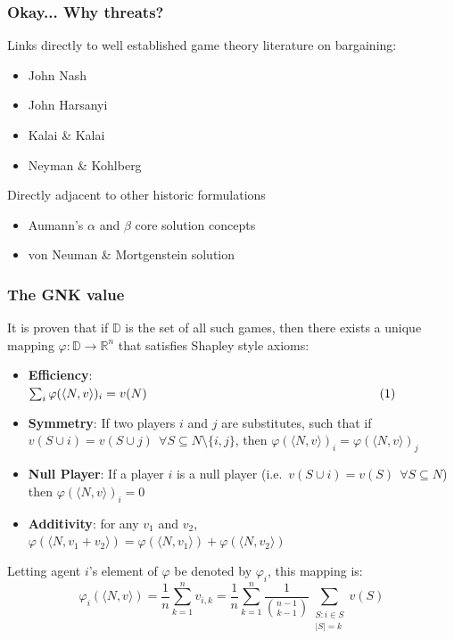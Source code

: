 \begin{frame}
\frametitle{Okay... Why threats?}

Links directly to well established game theory literature on bargaining:
\begin{itemize}
\item	John Nash \cite{nash1,nash2}
\item	John Harsanyi \cite{values3}
\item	Kalai \& Kalai \cite{kalai1,Kalai2010,shap_lectures}
\item	Neyman \& Kohlberg \cite{value2,KOHLBERG2018139}
\end{itemize}
Directly adjacent to other historic formulations
\begin{itemize}
\item	Aumann's $\alpha$ and $\beta$ core solution concepts \cite{aumann1961core}
\item	von Neuman \& Mortgenstein solution \cite{1944}
\end{itemize}

\end{frame}




\begin{frame}
\frametitle{The GNK value}
It is proven that if $\mathbb{D}$ is the set of all such games, then there exists a unique mapping $\varphi:\mathbb{D}\rightarrow\mathbb{R}^n$ that satisfies Shapley style axioms:

\begin{itemize}
\item	\textbf{Efficiency}: $\sum_i\varphi(\langle N,v\rangle)_i = v(N)\qquad\qquad\qquad\qquad\qquad\qquad\qquad\qquad\qquad~~\refstepcounter{equation}(\theequation)\label{myeq}$
\item	\textbf{Symmetry}: If two players $i$ and $j$ are substitutes, such that if $v(S\cup i)=v(S\cup j)~~\forall S\subseteq N\setminus\{i,j\}$, then $\varphi(\langle N,v\rangle)_i = \varphi(\langle N,v\rangle)_j$
\item	\textbf{Null Player}: If a player $i$ is a null player (i.e.\ $v(S\cup i)=v(S)~~\forall S\subseteq N$) then $\varphi(\langle N,v\rangle)_i=0$
\item	\textbf{Additivity}: for any $v_1$ and $v_2$, $\varphi(\langle N,v_1+v_2\rangle)=\varphi(\langle N,v_1 \rangle) + \varphi(\langle N,v_2\rangle)$
\end{itemize}

Letting agent $i$'s element of $\varphi$ be denoted by $\varphi_i$, this mapping is:
\begin{equation}\label{da_value_eq} 
\varphi_i(\langle N,v\rangle)
= \frac{1}{n}\sum_{k=1}^n v_{i,k} 
= \frac{1}{n}\sum_{k=1}^n \frac{1}{\binom{n-1}{k-1}} \sum_{\substack{S:i\in S \\ |S|=k}}v(S) 
\end{equation}
\end{frame}




